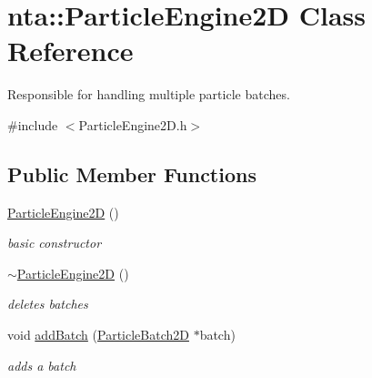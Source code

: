 \hypertarget{classnta_1_1ParticleEngine2D}{}\section{nta\+:\+:Particle\+Engine2D Class Reference}
\label{classnta_1_1ParticleEngine2D}


Responsible for handling multiple particle batches.  




{\ttfamily \#include $<$Particle\+Engine2\+D.\+h$>$}

\subsection*{Public Member Functions}
\begin{DoxyCompactItemize}
\item 
\mbox{\label{classnta_1_1ParticleEngine2D_a0fdd494f4e47d56ac2cee6306e682c0f}} 
\hyperlink{classnta_1_1ParticleEngine2D_a0fdd494f4e47d56ac2cee6306e682c0f}{Particle\+Engine2D} ()
\begin{DoxyCompactList}\small\item\em basic constructor \end{DoxyCompactList}\item 
\mbox{\label{classnta_1_1ParticleEngine2D_a9819d90a1852b474bb3014a8c8d506a1}} 
\hyperlink{classnta_1_1ParticleEngine2D_a9819d90a1852b474bb3014a8c8d506a1}{$\sim$\+Particle\+Engine2D} ()
\begin{DoxyCompactList}\small\item\em deletes batches \end{DoxyCompactList}\item 
\mbox{\label{classnta_1_1ParticleEngine2D_a1543908144e9aeb9ae1b7529e82c0ad7}} 
void \hyperlink{classnta_1_1ParticleEngine2D_a1543908144e9aeb9ae1b7529e82c0ad7}{add\+Batch} (\hyperlink{classnta_1_1ParticleBatch2D}{Particle\+Batch2D} $\ast$batch)
\begin{DoxyCompactList}\small\item\em adds a batch \end{DoxyCompactList}\item 
\mbox{\label{classnta_1_1ParticleEngine2D_a759937cf45e74162ce85269ddf59237b}} 

\end{DoxyCompactItemize}
